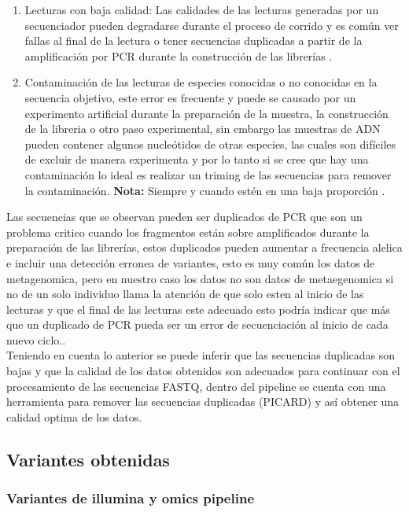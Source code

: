 \begin{enumerate}
	\item Lecturas con baja calidad: Las calidades de las lecturas generadas por un secuenciador pueden degradarse durante el proceso de corrido y es común ver fallas al final de la lectura o tener secuencias duplicadas a partir de la amplificación por PCR durante la construcción de las librerías \cite{Zhou2013}.
	\item Contaminación de las lecturas de especies conocidas o no conocidas en la secuencia objetivo, este error es frecuente y puede se causado por un experimento artificial durante la preparación de la muestra, la construcción de la libreria o otro paso experimental, sin embargo las muestras de ADN pueden contener algunos nucleótidos de otras especies, las cuales son difíciles de excluir de manera experimenta y por lo tanto si se cree que hay una contaminación lo ideal es realizar un triming de las secuencias para remover la contaminación. \textbf{Nota:} Siempre y cuando estén en una baja proporción \cite{Zhou2013}.
\end{enumerate}

Las secuencias que se  observan pueden ser duplicados de PCR que son un problema critico cuando los fragmentos están sobre amplificados durante la preparación de las librerías, estos duplicados pueden aumentar a frecuencia alelica e incluir una detección erronea de variantes, esto es muy común los datos de metagenomica, pero en nuestro caso los datos no son datos de metaegenomica si no de un solo individuo llama la atención de que solo esten al inicio de las lecturas y que el final de las lecturas este adecuado esto podría indicar que más que un duplicado de PCR pueda ser un error de secuenciación al inicio de cada nuevo ciclo.\cite{Pandey2016}. \\

Teniendo en cuenta lo anterior se puede inferir que las secuencias duplicadas son bajas y que la calidad de los datos obtenidos son adecuados para continuar con el procesamiento de las secuencias FASTQ, dentro del pipeline se cuenta con una herramienta para remover las secuencias duplicadas (PICARD) y así obtener una calidad optima de los datos.

\subsection*{Variantes obtenidas}
\subsubsection*{Variantes de illumina y omics pipeline}

